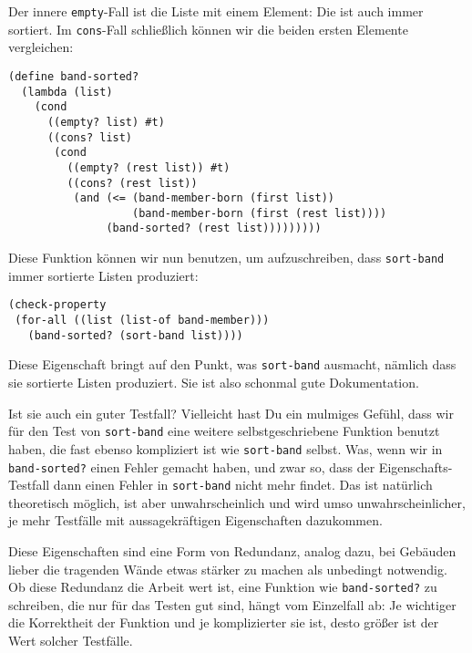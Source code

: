 %
Der innere \lstinline{empty}-Fall ist die Liste mit einem Element: Die
ist auch immer sortiert.  Im \lstinline{cons}-Fall schließlich können
wir die beiden ersten Elemente vergleichen:
%
\begin{lstlisting}
(define band-sorted?
  (lambda (list)
    (cond
      ((empty? list) #t)
      ((cons? list)
       (cond
         ((empty? (rest list)) #t)
         ((cons? (rest list))
          (and (<= (band-member-born (first list))
                   (band-member-born (first (rest list))))
               (band-sorted? (rest list)))))))))
\end{lstlisting}
%
Diese Funktion können wir nun benutzen, um aufzuschreiben, dass
\lstinline{sort-band} immer sortierte Listen produziert:
%
\begin{lstlisting}
(check-property
 (for-all ((list (list-of band-member)))
   (band-sorted? (sort-band list))))
\end{lstlisting}
%
Diese Eigenschaft bringt auf den Punkt, was \lstinline{sort-band}
ausmacht, nämlich dass sie sortierte Listen produziert.  Sie ist also
schonmal gute Dokumentation.

Ist sie auch ein guter Testfall?  Vielleicht hast Du ein mulmiges
Gefühl, dass wir für den Test von \lstinline{sort-band} eine weitere
selbstgeschriebene Funktion benutzt haben, die fast ebenso kompliziert
ist wie \lstinline{sort-band} selbst.  Was, wenn wir in
\lstinline{band-sorted?} einen Fehler gemacht haben, und zwar so,
dass der Eigenschafts-Testfall dann einen Fehler in
\lstinline{sort-band} nicht mehr findet.  Das ist natürlich
theoretisch möglich, ist aber unwahrscheinlich und wird umso
unwahrscheinlicher, je mehr Testfälle mit aussagekräftigen
Eigenschaften dazukommen.

Diese Eigenschaften sind eine Form von Redundanz,
analog dazu, bei Gebäuden lieber die tragenden Wände etwas stärker zu
machen als unbedingt notwendig.  Ob diese Redundanz die Arbeit wert
ist, eine Funktion wie \lstinline{band-sorted?} zu schreiben, die nur
für das Testen gut sind, hängt vom Einzelfall ab: Je wichtiger die
Korrektheit der Funktion und je komplizierter sie ist, desto größer
ist der Wert solcher Testfälle.

